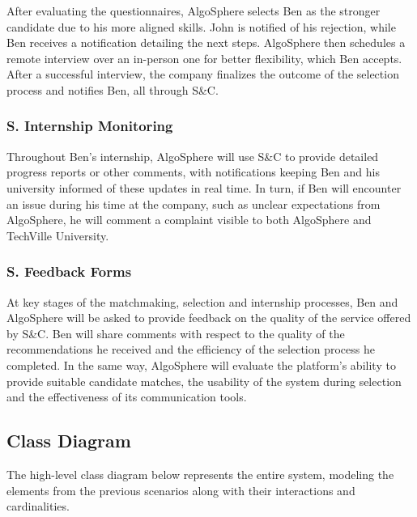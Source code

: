 After evaluating the questionnaires, AlgoSphere selects Ben as the stronger candidate due to his more aligned skills.
John is notified of his rejection, while Ben receives a notification detailing the next steps.
AlgoSphere then schedules a remote interview over an in-person one for better flexibility, which Ben accepts.
After a successful interview, the company finalizes the outcome of the selection process and notifies Ben, all through S\&C.

\subsubsection*{S\sco. Internship Monitoring}
Throughout Ben's internship, AlgoSphere will use S\&C to provide detailed progress reports or other comments, with notifications keeping Ben and his university informed of these updates in real time.
In turn, if Ben will encounter an issue during his time at the company, such as unclear expectations from AlgoSphere, he will comment a complaint visible to both AlgoSphere and TechVille University.

\subsubsection*{S\sco. Feedback Forms}
At key stages of the matchmaking, selection and internship processes, Ben and AlgoSphere will be asked to provide feedback on the quality of the service offered by S\&C.
Ben will share comments with respect to the quality of the recommendations he received and the efficiency of the selection process he completed.
In the same way, AlgoSphere will evaluate the platform's ability to provide suitable candidate matches, the usability of the system during selection and the effectiveness of its communication tools.

\subsection{Class Diagram}
The high-level class diagram below represents the entire system, modeling the elements from the previous scenarios along with their interactions and cardinalities.


